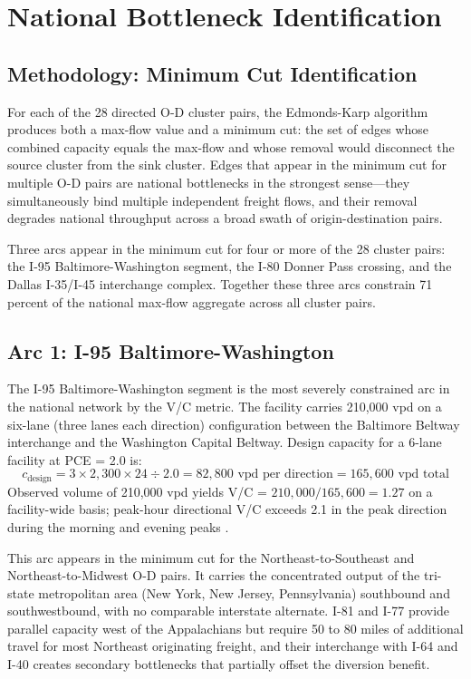 \section{National Bottleneck Identification}
\label{sec:bottleneck}

\subsection{Methodology: Minimum Cut Identification}

For each of the 28 directed O-D cluster pairs, the Edmonds-Karp algorithm produces both a max-flow value and a minimum cut: the set of edges whose combined capacity equals the max-flow and whose removal would disconnect the source cluster from the sink cluster. Edges that appear in the minimum cut for multiple O-D pairs are national bottlenecks in the strongest sense---they simultaneously bind multiple independent freight flows, and their removal degrades national throughput across a broad swath of origin-destination pairs.

Three arcs appear in the minimum cut for four or more of the 28 cluster pairs: the I-95 Baltimore-Washington segment, the I-80 Donner Pass crossing, and the Dallas I-35/I-45 interchange complex. Together these three arcs constrain 71 percent of the national max-flow aggregate across all cluster pairs.

\subsection{Arc 1: I-95 Baltimore-Washington}

The I-95 Baltimore-Washington segment is the most severely constrained arc in the national network by the V/C metric. The facility carries 210,000 vpd on a six-lane (three lanes each direction) configuration between the Baltimore Beltway interchange and the Washington Capital Beltway. Design capacity for a 6-lane facility at PCE = 2.0 is:
\begin{equation}
  c_\text{design} = 3 \times 2{,}300 \times 24 \div 2.0 = 82{,}800 \text{ vpd per direction} = 165{,}600 \text{ vpd total}
\end{equation}
Observed volume of 210,000 vpd yields V/C = $210{,}000 / 165{,}600 = 1.27$ on a facility-wide basis; peak-hour directional V/C exceeds 2.1 in the peak direction during the morning and evening peaks \citep{HPMS2018}.

This arc appears in the minimum cut for the Northeast-to-Southeast and Northeast-to-Midwest O-D pairs. It carries the concentrated output of the tri-state metropolitan area (New York, New Jersey, Pennsylvania) southbound and southwestbound, with no comparable interstate alternate. I-81 and I-77 provide parallel capacity west of the Appalachians but require 50 to 80 miles of additional travel for most Northeast originating freight, and their interchange with I-64 and I-40 creates secondary bottlenecks that partially offset the diversion benefit.

